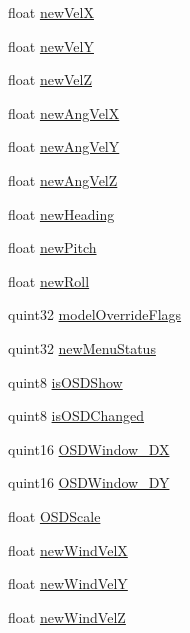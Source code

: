 \begin{DoxyCompactItemize}
float \hyperlink{group___aero_sim_r_c_ga963869a7b3f6432a6b42f9f239de0ca8}{new\-Vel\-X}
\item 
float \hyperlink{group___aero_sim_r_c_ga4ef77620e6e374b2af2bbd4e0d88fcfe}{new\-Vel\-Y}
\item 
float \hyperlink{group___aero_sim_r_c_ga09bc17352168fa2e9b782170e27c7c2b}{new\-Vel\-Z}
\item 
float \hyperlink{group___aero_sim_r_c_gafd7e1d21996abb68824a65505d845744}{new\-Ang\-Vel\-X}
\item 
float \hyperlink{group___aero_sim_r_c_gafe0593ec5f2487320a352c0f8bcb2f2d}{new\-Ang\-Vel\-Y}
\item 
float \hyperlink{group___aero_sim_r_c_ga6e895029ebb998be74c53cea057e83cf}{new\-Ang\-Vel\-Z}
\item 
float \hyperlink{group___aero_sim_r_c_ga11677816070d9ac5bc78d2c45338c0ec}{new\-Heading}
\item 
float \hyperlink{group___aero_sim_r_c_gae5174be9526399eb834a21d1d1e996d1}{new\-Pitch}
\item 
float \hyperlink{group___aero_sim_r_c_ga83b167dd0c9161f47923432618fac9c4}{new\-Roll}
\item 
quint32 \hyperlink{group___aero_sim_r_c_ga0fc062ffe3e17dd8ae14a181fbb50c1f}{model\-Override\-Flags}
\item 
quint32 \hyperlink{group___aero_sim_r_c_ga17602d21cacd40328f97406fb577e7a7}{new\-Menu\-Status}
\item 
quint8 \hyperlink{group___aero_sim_r_c_ga35a2acc4730f500b87b19630f57c14ed}{is\-O\-S\-D\-Show}
\item 
quint8 \hyperlink{group___aero_sim_r_c_gaa416deb314c63406b7320311d1cf71d7}{is\-O\-S\-D\-Changed}
\item 
quint16 \hyperlink{group___aero_sim_r_c_gafd433a8e475af009c6214cddba668878}{\-O\-S\-D\-Window\-\_\-\-D\-X}
\item 
quint16 \hyperlink{group___aero_sim_r_c_gab8199d2a82d29980a0ec47ad7fced1e1}{\-O\-S\-D\-Window\-\_\-\-D\-Y}
\item 
float \hyperlink{group___aero_sim_r_c_ga96db301b2cf97e19ccd774f1b93dad21}{\-O\-S\-D\-Scale}
\item 
float \hyperlink{group___aero_sim_r_c_ga894c4529647383039436d227ab09ea6d}{new\-Wind\-Vel\-X}
\item 
float \hyperlink{group___aero_sim_r_c_gaf7648b2c6048cddf0ba9fb68dfb55492}{new\-Wind\-Vel\-Y}
\item 
float \hyperlink{group___aero_sim_r_c_gaa84a637360a4648e08d41632fb8f38c0}{new\-Wind\-Vel\-Z}

\end{DoxyCompactItemize}
